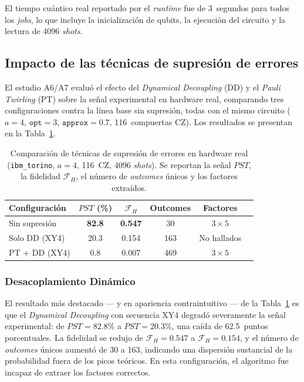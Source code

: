 \documentclass[12pt, spanish]{book}
\begin{document}
El tiempo cuántico real reportado por el \textit{runtime} fue de 3~segundos para todos los \textit{jobs}, lo que incluye la inicialización de qubits, la ejecución del circuito y la lectura de 4096 \textit{shots}.

\subsection{Impacto de las técnicas de supresión de errores}
\label{subsec:mitigacion_hardware}

El estudio A6/A7 evaluó el efecto del \textit{Dynamical Decoupling} (DD) y el \textit{Pauli Twirling} (PT) sobre la señal experimental en hardware real, comparando tres configuraciones contra la línea base sin supresión, todas con el mismo circuito ($a = 4$, $\texttt{opt} = 3$, $\texttt{approx} = 0.7$, 116~compuertas CZ). Los resultados se presentan en la Tabla~\ref{tab:mitigacion_hw}.

\begin{table}[H]
    \centering
    \caption{Comparación de técnicas de supresión de errores en hardware real (\texttt{ibm\_torino}, $a = 4$, 116~CZ, 4096 \textit{shots}). Se reportan la señal $PST$, la fidelidad $\mathcal{F}_H$, el número de \textit{outcomes} únicos y los factores extraídos.\\}
    \label{tab:mitigacion_hw}
    \begin{tabular}{lccccl}
        \hline
        Configuración  & $PST$ (\%)    & $\mathcal{F}_H$ & Outcomes & Factores     \\
        \hline
        Sin supresión & \textbf{82.8} & \textbf{0.547}  & 30       & $3 \times 5$ \\
        Solo DD (XY4)  & 20.3          & 0.154           & 163      & No hallados  \\
        PT + DD (XY4)  & 0.8           & 0.007           & 469      & $3 \times 5$ \\
        \hline
    \end{tabular}
\end{table}

\subsubsection{Desacoplamiento Dinámico}

El resultado más destacado --- y en apariencia contraintuitivo --- de la Tabla~\ref{tab:mitigacion_hw} es que el \textit{Dynamical Decoupling} con secuencia XY4 degradó severamente la señal experimental: de $PST = 82.8\%$ a $PST = 20.3\%$, una caída de 62.5~puntos porcentuales. La fidelidad se redujo de $\mathcal{F}_H = 0.547$ a $\mathcal{F}_H = 0.154$, y el número de \textit{outcomes} únicos aumentó de 30 a 163, indicando una dispersión sustancial de la probabilidad fuera de los picos teóricos. En esta configuración, el algoritmo fue incapaz de extraer los factores correctos.\\
\end{document}

